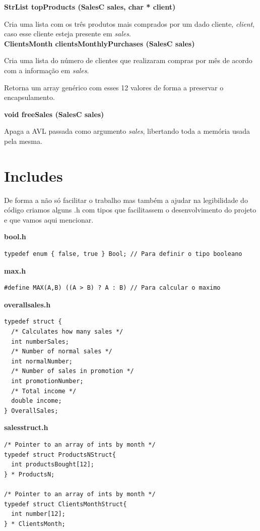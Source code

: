 \documentclass[10pt] {article}
\begin{document}
\noindent \textbf {StrList topProducts (SalesC sales, char * client)}
\par Cria uma lista com os três produtos mais comprados por um dado cliente, \emph{client}, caso esse cliente 
esteja presente em \emph{sales}. \\

\noindent \textbf {ClientsMonth clientsMonthlyPurchases (SalesC sales)}
\par Cria uma lista do número de clientes que realizaram compras por mês de acordo com a informação em \emph{sales}.
\par Retorna um array genérico com esses 12 valores de forma a preservar o encapsulamento.

\noindent \textbf {void freeSales (SalesC sales)}
\par Apaga a AVL passada como argumento \emph{sales}, libertando toda a memória usada pela mesma. \\

\newpage
\section{Includes}
\par De forma a não só facilitar o trabalho mas também a ajudar na legibilidade do código criamos alguns .h 
com tipos que facilitassem o desenvolvimento do projeto e que vamos aqui mencionar.

\textbf{bool.h}
\begin{lstlisting}
typedef enum { false, true } Bool; // Para definir o tipo booleano
\end{lstlisting}

\textbf{max.h}
\begin{lstlisting}
#define MAX(A,B) ((A > B) ? A : B) // Para calcular o maximo
\end{lstlisting}

\textbf{overallsales.h}
\begin{lstlisting}
typedef struct {
  /* Calculates how many sales */
  int numberSales; 
  /* Number of normal sales */
  int normalNumber;
  /* Number of sales in promotion */
  int promotionNumber;
  /* Total income */
  double income;
} OverallSales;
\end{lstlisting}

\textbf{salesstruct.h}
\begin{lstlisting}
/* Pointer to an array of ints by month */
typedef struct ProductsNStruct{
  int productsBought[12];
} * ProductsN;

/* Pointer to an array of ints by month */
typedef struct ClientsMonthStruct{
  int number[12];
} * ClientsMonth;
\end{lstlisting}
\end{document}
